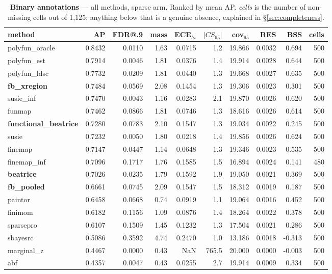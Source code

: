 \begin{table}[htbp]\centering\small
\caption{\textbf{Binary annotations} --- all methods, sparse arm. Ranked by mean AP. \emph{cells} is the number of non-missing cells out of 1{,}125; anything below that is a genuine absence, explained in \S\ref{sec:completeness}.}
\label{tab:main-binary}
\begin{tabular}{lrrrrrrrr r}\toprule
method & AP & FDR@.9 & mass & ECE$_{hi}$ & $|CS_{95}|$ & cov$_{95}$ & RES & BSS & cells\\\midrule
polyfun\_oracle & 0.8432 & 0.0110 & 1.63 & 0.0715 & 1.2 & 19.866 & 0.0032 & 0.694 & 500\\
polyfun\_est & 0.7914 & 0.0046 & 1.81 & 0.0376 & 1.4 & 19.914 & 0.0028 & 0.644 & 500\\
polyfun\_ldsc & 0.7732 & 0.0209 & 1.81 & 0.0440 & 1.3 & 19.668 & 0.0027 & 0.635 & 500\\
\textbf{fb\_xregion} & 0.7484 & 0.0569 & 2.08 & 0.1454 & 1.3 & 19.306 & 0.0023 & 0.301 & 500\\
susie\_inf & 0.7470 & 0.0043 & 1.16 & 0.0283 & 2.1 & 19.870 & 0.0026 & 0.620 & 500\\
funmap & 0.7462 & 0.0866 & 1.81 & 0.0746 & 1.3 & 18.616 & 0.0026 & 0.614 & 500\\
\textbf{functional\_beatrice} & 0.7280 & 0.0783 & 2.10 & 0.1547 & 1.3 & 19.034 & 0.0022 & 0.245 & 500\\
susie & 0.7232 & 0.0050 & 1.80 & 0.0218 & 1.4 & 19.856 & 0.0026 & 0.624 & 500\\
finemap & 0.7147 & 0.0447 & 1.14 & 0.0648 & 1.3 & 19.346 & 0.0023 & 0.535 & 500\\
finemap\_inf & 0.7096 & 0.1717 & 1.76 & 0.1585 & 1.5 & 16.894 & 0.0024 & 0.141 & 480\\
\textbf{beatrice} & 0.7026 & 0.0235 & 1.79 & 0.1592 & 1.9 & 19.050 & 0.0021 & 0.369 & 500\\
\textbf{fb\_pooled} & 0.6661 & 0.0745 & 2.09 & 0.1547 & 1.5 & 18.312 & 0.0019 & 0.187 & 500\\
paintor & 0.6458 & 0.0668 & 0.74 & 0.0919 & 1.1 & 19.064 & 0.0016 & 0.452 & 500\\
finimom & 0.6182 & 0.1156 & 1.09 & 0.0876 & 1.4 & 18.264 & 0.0022 & 0.378 & 500\\
sparsepro & 0.6107 & 0.1509 & 1.45 & 0.1232 & 1.3 & 17.504 & 0.0021 & 0.286 & 500\\
sbayesrc & 0.5086 & 0.3592 & 4.74 & 0.2470 & 1.0 & 13.186 & 0.0018 & -0.313 & 500\\
marginal\_z & 0.4467 & 0.0000 & 0.43 & NaN & 765.5 & 20.000 & 0.0000 & -0.003 & 500\\
abf & 0.4357 & 0.0047 & 0.43 & 0.0255 & 2.7 & 19.914 & 0.0009 & 0.334 & 500\\
\bottomrule\end{tabular}\end{table}
